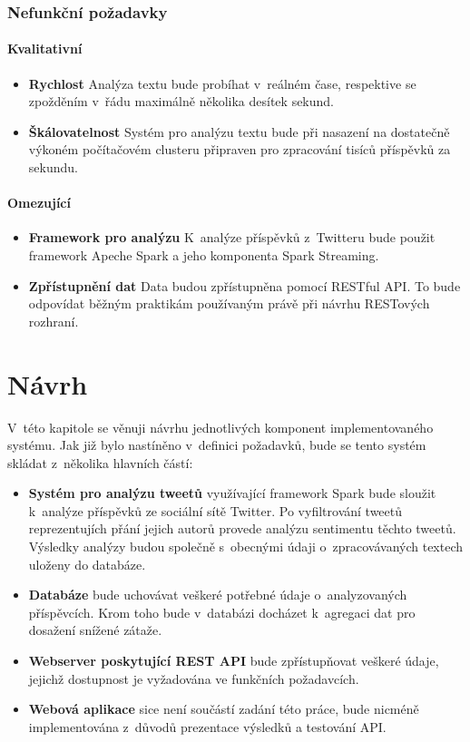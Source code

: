 \documentclass[thesis=B,czech]{FITthesis}[2012/06/26]
\begin{document}
\subsection{Nefunkční požadavky}
\subsubsection{Kvalitativní}
\begin{itemize}
\item \textbf{Rychlost} Analýza textu bude probíhat v~reálném čase, respektive se zpožděním v~řádu maximálně několika desítek sekund.
\item \textbf{Škálovatelnost} Systém pro analýzu textu bude při nasazení na dostatečně výkoném počítačovém clusteru připraven pro zpracování tisíců příspěvků za sekundu.
\end{itemize}
\subsubsection{Omezující}
\begin{itemize}
\item \textbf{Framework pro analýzu} K~analýze příspěvků z~Twitteru bude použit framework Apeche Spark a jeho komponenta Spark Streaming.
\item \textbf{Zpřístupnění dat} Data budou zpřístupněna pomocí RESTful API. To bude odpovídat běžným praktikám používaným právě při návrhu RESTových rozhraní.
\end{itemize}


\chapter{Návrh}
\label{navrh}
V~této kapitole se věnuji návrhu jednotlivých komponent implementovaného systému. Jak již bylo nastíněno v~definici požadavků, bude se tento systém skládat z~několika hlavních částí: 
\begin{itemize}
\item \textbf{Systém pro analýzu tweetů} využívající framework Spark bude sloužit k~analýze příspěvků ze sociální sítě Twitter. Po vyfiltrování tweetů reprezentujích přání jejich autorů provede analýzu sentimentu těchto tweetů. Výsledky analýzy budou společně s~obecnými údaji o~zpracovávaných textech uloženy do databáze. 
\item \textbf{Databáze} bude uchovávat veškeré potřebné údaje o~analyzovaných příspěvcích. Krom toho bude v~databázi docházet k~agregaci dat pro dosažení snížené zátaže. 
\item \textbf{Webserver poskytující REST API} bude zpřístupňovat veškeré údaje, jejichž dostupnost je vyžadována ve funkčních požadavcích. 
\item \textbf{Webová aplikace} sice není součástí zadání této práce, bude nicméně implementována z~důvodů prezentace výsledků a testování API. 
\end{itemize}
\end{document}
